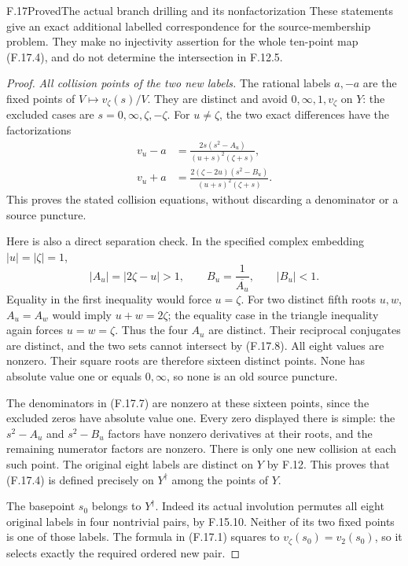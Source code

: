 \begin{claim}{F.17}{Proved}{The actual branch drilling and its nonfactorization}
These statements give an exact additional labelled
correspondence for the source-membership problem.
They make no injectivity assertion for the whole
ten-point map (F.17.4), and do not determine the
intersection in F.12.5.
\end{claim}

\begin{proof}
\emph{All collision points of the two new labels.}
The rational labels $a,-a$ are the fixed points of
$V\mapsto v_\zeta(s)/V$.
They are distinct and avoid $0,\infty,1,v_\zeta$
on $Y$: the excluded cases are $s=0,\infty,\zeta,-\zeta$.
For $u\ne\zeta$, the two exact differences have the
factorizations
\[
\begin{split}
 v_u-a
   &=\frac{2s(s^2-A_u)}{(u+s)^2(\zeta+s)},\\
 v_u+a
   &=\frac{2(\zeta-2u)(s^2-B_u)}
                {(u+s)^2(\zeta+s)}.
\end{split}                                                     \tag{F.17.7}
\]
This proves the stated collision equations, without
discarding a denominator or a source puncture.

Here is also a direct separation check.
In the specified complex embedding $|u|=|\zeta|=1$,
\[
 |A_u|=|2\zeta-u|>1,\qquad
                  B_u=\frac1{\overline{A_u}},\qquad |B_u|<1.
                                                               \tag{F.17.8}
\]
Equality in the first inequality would force $u=\zeta$.
For two distinct fifth roots $u,w$,
$A_u=A_w$ would imply $u+w=2\zeta$; the equality case
in the triangle inequality again forces $u=w=\zeta$.
Thus the four $A_u$ are distinct.  Their reciprocal
conjugates are distinct, and the two sets cannot
intersect by (F.17.8).
All eight values are nonzero.
Their square roots are therefore sixteen distinct
points.  None has absolute value one or equals
$0,\infty$, so none is an old source puncture.

The denominators in (F.17.7) are nonzero at these
sixteen points, since the excluded zeros have
absolute value one.
Every zero displayed there is simple:
the $s^2-A_u$ and $s^2-B_u$ factors have nonzero
derivatives at their roots, and the remaining
numerator factors are nonzero.
There is only one new collision at each such point.
The original eight labels are distinct on $Y$ by F.12.
This proves that (F.17.4) is defined precisely on
$Y^\dagger$ among the points of $Y$.

The basepoint $s_0$ belongs to $Y^\dagger$.
Indeed its actual involution permutes all eight
original labels in four nontrivial pairs, by F.15.10.
Neither of its two fixed points is one of those labels.
The formula in (F.17.1) squares to $v_\zeta(s_0)=v_2(s_0)$,
so it selects exactly the required ordered new pair.


\end{proof}
